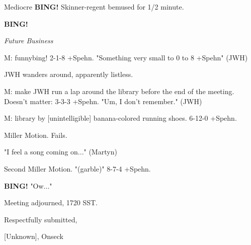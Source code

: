 \documentclass[12pt]{article}
\newcommand{\bing}{{\bf BING!} }
\newcommand{\goto}[1]{\bing \vskip 12pt \centerline{{\em{#1}}}}
\begin{document}
Mediocre \bing Skinner-regent bemused for 1/2 minute.

\goto{Future Business}

M: funnybing! 2-1-8 +Spehn. "Something very small to 0 to 8 +Spehn" (JWH)

JWH wanders around, apparently listless.

M: make JWH run a lap around the library before the end of the meeting. Doesn't matter: 3-3-3 +Spehn. "Um, I don't remember." (JWH)

M: library by [unintelligible] banana-colored running shoes. 6-12-0 +Spehn.

Miller Motion. Fails.

"I feel a song coming on..." (Martyn)

Second Miller Motion. "(garble)" 8-7-4 +Spehn.

\bing "Ow..."

\vspace{12pt}

\noindent
Meeting adjourned, 1720 SST.

\vspace{18pt}

\centerline{Respectfully submitted,}
\centerline{[Unknown], Onseck}
\end{document}
